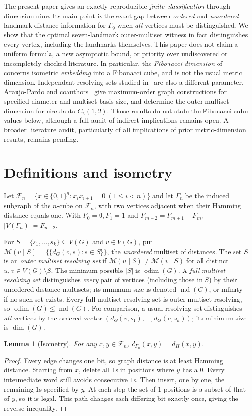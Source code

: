 \documentclass[10pt,a4paper]{article}
\newtheorem{lemma}[theorem]{Lemma}
\newcommand{\odim}{\operatorname{odim}}
\newcommand{\md}{\operatorname{md}}
\newcommand{\G}{\Gamma}
\newcommand{\F}{\mathcal{F}}
\newcommand{\rep}{\mathcal{M}}
\begin{document}
The present paper gives an exactly reproducible \emph{finite classification} through dimension nine.
Its main point is the exact gap between \emph{ordered} and \emph{unordered}
landmark-distance information for $\G_9$ when \emph{all} vertices must be distinguished.
We show that the optimal seven-landmark outer-multiset witness in fact distinguishes
every vertex, including the landmarks themselves. This paper does not claim a uniform formula, a new asymptotic bound,
or priority over undiscovered or incompletely checked literature.
In particular, the \emph{Fibonacci dimension} of~\cite{Cabello2011} concerns
isometric \emph{embedding} into a Fibonacci cube, and is not the usual metric dimension.
Independent resolving sets studied in~\cite{Monica2017} are also a different parameter.
Araujo-Pardo and coauthors~\cite{Araujo2026} give maximum-order graph
constructions for specified diameter and multiset basis size, and determine the
outer multiset dimension for circulants $C_n(1,2)$. Those results do not state the
Fibonacci-cube values below, although a full audit of indirect implications remains open.
A broader literature audit, particularly of all implications of prior metric-dimension results, remains pending.

\section{Definitions and isometry}
Let $\F_n=\{x\in\{0,1\}^n:x_ix_{i+1}=0\ (1\le i<n)\}$ and
let $\G_n$ be the induced subgraph of the $n$-cube on $\F_n$, with two vertices adjacent
when their Hamming distance equals one. With $F_0=0,F_1=1$ and $F_{m+2}=F_{m+1}+F_m$,
$|V(\G_n)|=F_{n+2}$.

For $S=\{s_1,\ldots,s_k\}\subseteq V(G)$ and $v\in V(G)$, put
$\rep(v\mid S)=\{\!\{d_G(v,s):s\in S\}\!\}$, the \emph{unordered} multiset of distances.
The set $S$ is an \emph{outer multiset resolving set} if
$\rep(u\mid S)\ne\rep(v\mid S)$ for all distinct $u,v\in V(G)\setminus S$.
The minimum possible $|S|$ is $\odim(G)$.
A \emph{full multiset resolving set} distinguishes \emph{every} pair of vertices
(including those in $S$) by their unordered distance multisets; its minimum size
is denoted $\md(G)$, or infinity if no such set exists. Every full multiset resolving
set is outer multiset resolving, so $\odim(G)\le\md(G)$.
For comparison, a usual resolving set distinguishes \emph{all} vertices by the ordered vector
$(d_G(v,s_1),\ldots,d_G(v,s_k))$; its minimum size is $\dim(G)$.

\begin{lemma}[Isometry]
For any $x,y\in\F_n$, $d_{\G_n}(x,y)=d_H(x,y)$.
\end{lemma}
\begin{proof}
Every edge changes one bit, so graph distance is at least Hamming distance.
Starting from $x$, delete all $1$s in positions where $y$ has a $0$.
Every intermediate word still avoids consecutive $1$s.
Then insert, one by one, the remaining $1$s specified by $y$.
At each step the set of $1$ positions is a subset of that of $y$, so it is legal.
This path changes each differing bit exactly once, giving the reverse inequality.
\end{proof}
\end{document}
